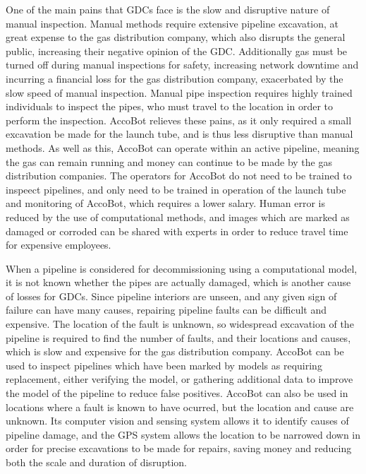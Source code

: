 \documentclass[11pt]{article}		%
\begin{document}
		One of the main pains that GDCs face is the slow and disruptive nature of manual inspection.
		Manual methods require extensive pipeline excavation, at great expense to the gas distribution company, which also disrupts the general public, increasing their negative opinion of the GDC.
		Additionally gas must be turned off during manual inspections for safety, increasing network downtime and incurring a financial loss for the gas distribution company, exacerbated by the slow speed of manual inspection.
		Manual pipe inspection requires highly trained individuals to inspect the pipes, who must travel to the location in order to perform the inspection.
		AccoBot relieves these pains, as it only required a small excavation be made for the launch tube, and is thus less disruptive than manual methods.
		As well as this, AccoBot can operate within an active pipeline, meaning the gas can remain running and money can continue to be made by the gas distribution companies.
		The operators for AccoBot do not need to be trained to inspeect pipelines, and only need to be trained in operation of the launch tube and monitoring of AccoBot, which requires a lower salary.
		Human error is reduced by the use of computational methods, and images which are marked as damaged or corroded can be shared with experts in order to reduce travel time for expensive employees.
		
		When a pipeline is considered for decommissioning using a computational model, it is not known whether the pipes are actually damaged, which is another cause of losses for GDCs.
		Since pipeline interiors are unseen, and any given sign of failure can have many causes, repairing pipeline faults can be difficult and expensive.
		The location of the fault is unknown, so widespread excavation of the pipeline is required to find the number of faults, and their locations and causes, which is slow and expensive for the gas distribution company.
		AccoBot can be used to inspect pipelines which have been marked by models as requiring replacement, either verifying the model, or gathering additional data to improve the model of the pipeline to reduce false positives.
		AccoBot can also be used in locations where a fault is known to have ocurred, but the location and cause are unknown.
		Its computer vision and sensing system allows it to identify causes of pipeline damage, and the GPS system allows the location to be narrowed down in order for precise excavations to be made for repairs, saving money and reducing both the scale and duration of disruption.
		
\end{document}
